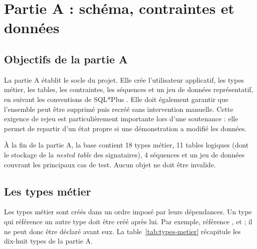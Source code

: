 \chapter{Partie A : schéma, contraintes et données}
\label{chap:partieA}

\section{Objectifs de la partie A}

La partie A établit le socle du projet. Elle crée l'utilisateur applicatif, les
types métier, les tables, les contraintes, les séquences et un jeu de données
représentatif, en suivant les conventions de SQL*Plus \cite{oracleSQLPlus}. Elle doit également garantir que l'ensemble peut être supprimé
puis recréé sans intervention manuelle. Cette exigence de rejeu est
particulièrement importante lors d'une soutenance : elle permet de repartir
d'un état propre si une démonstration a modifié les données.

\begin{objectifbox}
À la fin de la partie A, la base contient 18 types métier, 11 tables logiques
(dont le stockage de la \emph{nested table} des signataires), 4 séquences et un
jeu de données couvrant les principaux cas de test. Aucun objet ne doit être
invalide.
\end{objectifbox}

\section{Les types métier}

Les types métier sont créés dans un ordre imposé par leurs dépendances. Un type
qui référence un autre type doit être créé après lui. Par exemple,
 référence ,  et
 ; il ne peut donc être déclaré avant eux. La
table~\ref{tab:types-metier} récapitule les dix-huit types de la partie A.

